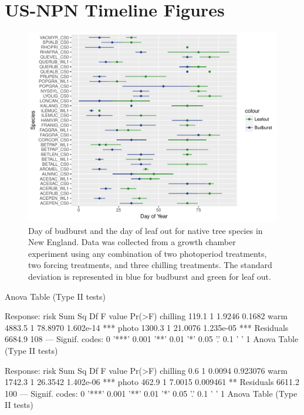 \documentclass{article}\usepackage[]{graphicx}\usepackage[]{color}
\begin{document}
\renewcommand{\thetable}{\arabic{table}}
\renewcommand{\thefigure}{\arabic{figure}}
\renewcommand{\labelitemi}{$-$}
\section*{US-NPN Timeline Figures}

\begin{figure} [H]
\begin{center}
\caption{Day of budburst and the day of leaf out for native tree species in New England. Data was collected from a growth chamber experiment using any combination of two photoperiod treatments, two forcing treatments, and three chilling treatments. The standard deviation is represented in blue for budburst and green for leaf out. }
\includegraphics{..//output/Dan_TXandSp.pdf} 
\end{center}
\end{figure}


Anova Table (Type II tests)

Response: risk
          Sum Sq  Df F value    Pr(>F)    
chilling   119.1   1  1.9246    0.1682    
warm      4883.5   1 78.8970 1.602e-14 ***
photo     1300.3   1 21.0076 1.235e-05 ***
Residuals 6684.9 108                      
---
Signif. codes:  0 '***' 0.001 '**' 0.01 '*' 0.05 '.' 0.1 ' ' 1
Anova Table (Type II tests)

Response: risk
          Sum Sq  Df F value    Pr(>F)    
chilling     0.6   1  0.0094  0.923076    
warm      1742.3   1 26.3542 1.402e-06 ***
photo      462.9   1  7.0015  0.009461 ** 
Residuals 6611.2 100                      
---
Signif. codes:  0 '***' 0.001 '**' 0.01 '*' 0.05 '.' 0.1 ' ' 1
Anova Table (Type II tests)
\end{document}
